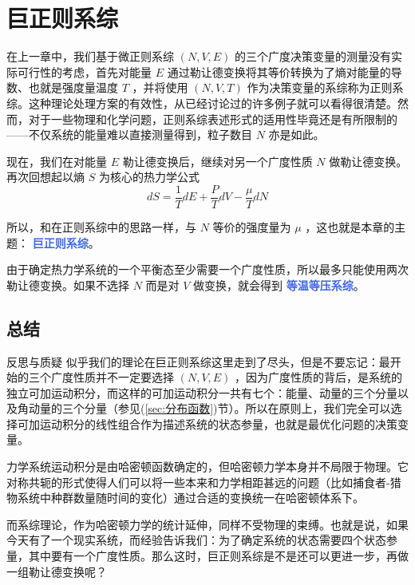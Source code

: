 
\chapter{巨正则系综}\label{cha:巨正则系综}

在上一章中，我们基于微正则系综 $(N,V,E)$ 的三个广度决策变量的测量没有实际可行性的考虑，首先对能量 $E$ 通过勒让德变换将其等价转换为了熵对能量的导数、也就是强度量温度 $T$ ，并将使用 $(N,V,T)$ 作为决策变量的系综称为正则系综。这种理论处理方案的有效性，从已经讨论过的许多例子就可以看得很清楚。然而，对于一些物理和化学问题，正则系综表述形式的适用性毕竟还是有所限制的——不仅系统的能量难以直接测量得到，粒子数目 $N$ 亦是如此。

现在，我们在对能量 $E$ 勒让德变换后，继续对另一个广度性质 $N$ 做勒让德变换。再次回想起以熵 $S$ 为核心的热力学公式
\[
    dS = \frac{1}{T} dE + \frac{P}{T} dV - \frac{\mu}{T} dN
\]

所以，和在正则系综中的思路一样，与 $N$ 等价的强度量为 $\mu$ ，这也就是本章的主题： \textcolor{RoyalBlue}{\textbf{\kaishu 巨正则系综}}。

由于确定热力学系统的一个平衡态至少需要一个广度性质，所以最多只能使用两次勒让德变换。如果不选择 $N$ 而是对 $V$ 做变换，就会得到 \textcolor{RoyalBlue}{\textbf{\kaishu 等温等压系综}}。



\section{总结}\label{sec:巨正则总结}

\begin{justification}{\kaishu 反思与质疑}
\kaishu \fontsize{11pt}{16pt}
    \quad\quad 似乎我们的理论在巨正则系综这里走到了尽头，但是不要忘记：最开始的三个广度性质并不一定要选择 $(N,V,E)$ ，因为广度性质的背后，是系统的独立可加运动积分，而这样的可加运动积分一共有七个：能量、动量的三个分量以及角动量的三个分量（参见(\ref*{sec:分布函数})节）。所以在原则上，我们完全可以选择可加运动积分的线性组合作为描述系统的状态参量，也就是最优化问题的决策变量。

    \quad\quad 力学系统运动积分是由哈密顿函数确定的，但哈密顿力学本身并不局限于物理。它对称共轭的形式使得人们可以将一些本来和力学相距甚远的问题（比如捕食者-猎物系统中种群数量随时间的变化）通过合适的变换统一在哈密顿体系下。
    
    \quad\quad 而系综理论，作为哈密顿力学的统计延伸，同样不受物理的束缚。也就是说，如果今天有了一个现实系统，而经验告诉我们：为了确定系统的状态需要四个状态参量，其中要有一个广度性质。那么这时，巨正则系综是不是还可以更进一步，再做一组勒让德变换呢？
\end{justification}